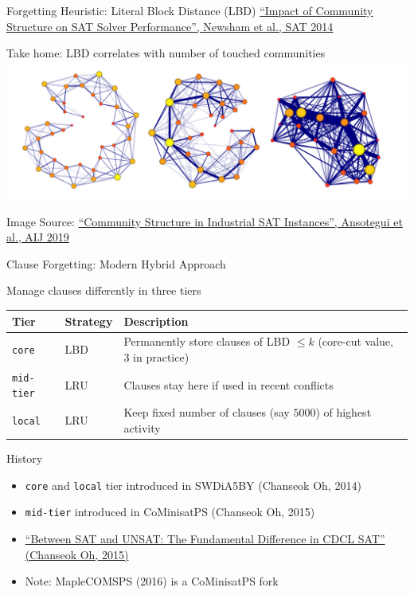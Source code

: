 \documentclass[t]{sdqbeamer}
\begin{document}
    
\begin{frame}{Forgetting Heuristic: Literal Block Distance (LBD)}
\href{http://www.cril.univ-artois.fr/articles/communities.pdf}{``Impact of Community Structure on SAT Solver Performance'', Newsham et al., SAT 2014}
\begin{block}{Take home: LBD correlates with number of touched communities}
\centering
\centering\includegraphics[width=.9\linewidth]{figures/l06/community-structure-and-learning.png}
\vspace*{-1em}
\begin{flushright}
    \footnotesize
    Image Source: \href{https://arxiv.org/pdf/1606.03329}{``Community Structure in Industrial SAT Instances'', Ansotegui et al., AIJ 2019}
\end{flushright}
\end{block}
\end{frame}
    
    
\begin{frame}{Clause Forgetting: Modern Hybrid Approach}
\begin{block}{Manage clauses differently in three tiers}
    \begin{tabularx}{\linewidth}{l|l|X}
        \bf Tier & \bf Strategy & \bf Description\\
        \hline
        \texttt{core} & LBD & Permanently store clauses of LBD $\leq k$ (core-cut value, $3$ in practice)\\
        \texttt{mid-tier} & LRU & Clauses stay here if used in recent conflicts\\
        \texttt{local} & LRU & Keep fixed number of clauses (say $5000$) of highest activity
    \end{tabularx}
\end{block}
\begin{block}{History}
    \begin{itemize}
    \item \texttt{core} and \texttt{local} tier introduced in SWDiA5BY (Chanseok Oh, 2014)
    \item \texttt{mid-tier} introduced in CoMinisatPS (Chanseok Oh, 2015)
    \item \href{https://link.springer.com/chapter/10.1007/978-3-319-24318-4_23}{``Between SAT and UNSAT: The Fundamental Difference in CDCL SAT'' (Chanseok Oh, 2015)}
    \item Note: MapleCOMSPS (2016) is a CoMinisatPS fork
    \end{itemize}
\end{block}
\end{frame}
\end{document}
